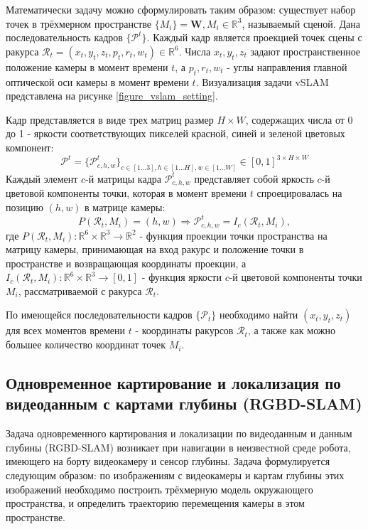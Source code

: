 \documentclass{mipt-thesis-ms}
\begin{document}
	Математически задачу можно сформулировать таким образом: существует набор точек в трёхмерном пространстве $\{M_i \} = \textbf{W}, M_i \in \mathbb{R}^3$, называемый сценой. Дана последовательность кадров $\{\mathcal{P}^t\}$. Каждый кадр является проекцией точек сцены с ракурса $\mathcal{R}_t = (x_t, y_t, z_t, p_t, r_t, w_t) \in \mathbb{R}^6$. Числа $x_t, y_t, z_t$ задают пространственное положение камеры в момент времени $t$, а $p_t, r_t, w_t$ - углы направления главной оптической оси камеры в момент времени $t$. Визуализация задачи vSLAM представлена на рисунке \ref{figure_vslam_setting}.
	
	Кадр представляется в виде трех матриц размер $H \times W$, содержащих числа от 0 до 1 - яркости соответствующих пикселей красной, синей и зеленой цветовых компонент:
	$$\mathcal{P}^t = \{\mathcal{P}^t_{c,h,w}\}_{c \in [1 \dots 3], h \in [1 \dots H], w \in [1 \dots W]} \in [0, 1]^{3 \times H \times W}$$
	Каждый элемент $c$-й матрицы кадра $\mathcal{P}^t_{c,h,w}$ представляет собой яркость $c$-й цветовой компоненты точки, которая в момент времени $t$ спроецировалась на позицию $(h, w)$ в матрице камеры:
	$$P(\mathcal{R}_t, M_i) = (h, w) \Rightarrow \mathcal{P}^t_{c,h,w} = I_c(\mathcal{R}_t, M_i),$$
	где $P(\mathcal{R}_t, M_i): \mathbb{R}^6 \times \mathbb{R}^3 \rightarrow \mathbb{R}^2$ - функция проекции точки пространства на матрицу камеры, принимающая на вход ракурс и положение точки в пространстве и возвращающая координаты проекции, а $I_c (\mathcal{R}_t, M_i): \mathbb{R}^6 \times \mathbb{R}^3 \rightarrow [0, 1]$ - функция яркости $c$-й цветовой компоненты точки $M_i$, рассматриваемой с ракурса $\mathcal{R}_t$.
	
	По имеющейся последовательности кадров $\{\mathcal{P}_t\}$ необходимо найти $(x_t, y_t, z_t)$ для всех моментов времени $t$ - координаты ракурсов $\mathcal{R}_t$, а также как можно большее количество координат точек $M_i$.
	
	\subsection{Одновременное картирование и локализация по видеоданным с картами глубины (RGBD-SLAM)}
	
	Задача одновременного картирования и локализации по видеоданным и данным глубины (RGBD-SLAM) возникает при навигации в неизвестной среде робота, имеющего на борту видеокамеру и сенсор глубины. Задача формулируется следующим образом: по изображениям с видеокамеры и картам глубины этих изображений необходимо построить трёхмерную модель окружающего пространства, и определить траекторию перемещения камеры в этом пространстве.
	
\end{document}
